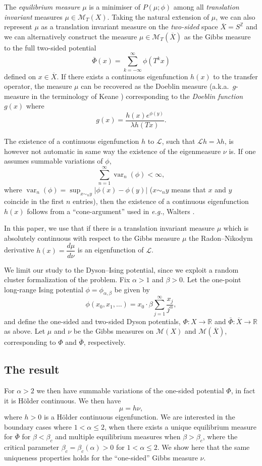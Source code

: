 \documentclass[11pt, a4paper]{amsart}
\theoremstyle{definition}
\theoremstyle{remark}
\providecommand{\RR}{\mathbb{R}}
\providecommand{\ZZ}{\mathbb{Z}}
\providecommand{\CM}{\mathscr{M}}
\providecommand{\mscr}{\mathscr}
\providecommand{\mc}{\mathcal}
\providecommand{\opn}{\operatorname}
\providecommand{\ol}{\overline}
\providecommand{\var}{\opn{var}}
\def\X{X}
\def\T{T}
\begin{document}
The \emph{equilibrium measure} $\mu$ is a minimiser of $P(\mu;\phi)$ among all
\emph{translation invariant} measures $\mu\in{\CM}_\T(\X)$. Taking the natural
extension of $\mu$, we can also represent $\mu$ as a translation invariant measure
on the \emph{two-sided} space $\ol\X = S^\ZZ$ and we can alternatively construct
the measure $\mu\in\CM_\T(\ol\X)$ as the Gibbs measure to the full two-sided potential
\[
  \ol \Phi(x)=\sum_{k=-\infty}^\infty \phi(\T^k x)
\]
defined on $x\in\ol\X$.
If there exists a continuous eigenfunction $h(x)$ to the transfer operator, the
measure $\mu$ can be recovered as the Doeblin measure \cite{berger2} (a.k.a.\
$g$-measure in the terminology of Keane \cite{keane}) corresponding to the
\emph{Doeblin function} $g(x)$ where
\begin{equation}\label{g}
  g(x)= \frac{h(x) e^{\phi(y)}}{\lambda h(\T x)}.
\end{equation}

The existence of a continuous eigenfunction $h$ to $\mc{L}$, such that
$\mc{L}h=\lambda h$, is however not automatic in same way the existence of the
eigenmeasure $\nu$ is. If one assumes summable variations of $\phi$,
\begin{equation}\label{sum}
  \sum_{n=1}^\infty \var_n (\phi)<\infty,
\end{equation}
where $\var_n(\phi)=\sup_{x\sim_n y}|\phi(x)-\phi(y)|$ ($x\sim_n y$ means that $x$ and $y$
coincide in the first $n$ entries), then the existence of a continuous
eigenfunction $h(x)$ follows from a ``cone-argument'' used in {\em
  e.g.}, Walters \cite{walters1}. 
  
In this paper, we use that if there is a translation invariant measure $\mu$ which is
absolutely continuous with respect to the Gibbs measure $\mu$ the Radon--Nikodym
derivative $h(x)=\dfrac{d\mu}{d\nu}$ is an eigenfunction of $\mscr L$.

We limit our study to the Dyson--Ising potential, since we exploit a random cluster formalization of
the problem. Fix $\alpha>1$ and $\beta>0$. Let the
one-point long-range Ising potential $\phi=\phi_{\alpha,\beta}$ be given by
$$\phi(x_0, x_1,\ldots)=x_0\cdot \beta \sum_{j=1}^\infty \frac{x_j}{j^\alpha},$$
and define the one-sided and two-sided Dyson potentials, $\Phi:\X\to \RR$ and
$\bar\Phi:\ol\X\to\RR$ as above. Let $\mu$ and $\nu$ be the Gibbs measures on $\CM(\X)$
and $\CM(\ol\X)$, corresponding to $\Phi$ and $\ol\Phi$, respectively.

\subsection{The result}
For $\alpha>2$ we then have summable variations of the one-sided potential $\Phi$, in fact it is H\"older continuous. We then have 
$$ \mu= h\nu, $$
where $h>0$ is a H\"older continuous eigenfunction. We are interested in the
boundary cases where $1<\alpha\le2$, when there exists a unique equilibrium measure for
$\ol\Phi$ for $\beta<\beta_c$ \cite{ACCN} and multiple equilibrium measures when $\beta>\beta_c$,
where the critical parameter $\beta_c=\beta_c(\alpha)>0$ for $1<\alpha\le2$. We show here that the
same uniqueness properties holds for the ``one-sided'' Gibbs measure $\nu$.
\end{document}
